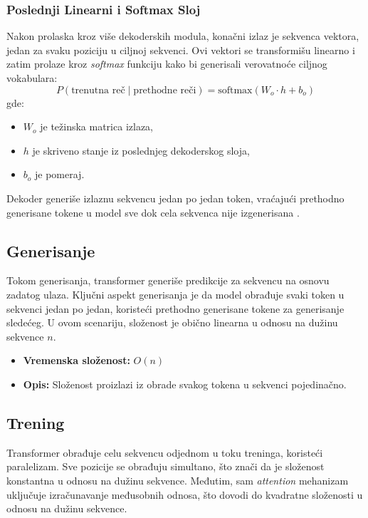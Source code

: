 \documentclass[12pt]{article}
\begin{document}
   \subsubsection*{Poslednji Linearni i Softmax Sloj}
   Nakon prolaska kroz više dekoderskih modula, konačni izlaz je sekvenca vektora, 
   jedan za svaku poziciju u ciljnoj sekvenci. Ovi vektori se transformišu 
   linearno i zatim prolaze kroz \textit{softmax} funkciju kako bi generisali verovatnoće 
   ciljnog vokabulara:
   \[
   P(\text{trenutna reč} \mid \text{prethodne reči}) = \text{softmax}(W_o \cdot h + b_o)
   \]
   \newpage
   gde:
   \begin{itemize}
      \vspace{-0.5cm}
      \setlength\itemsep{0.2em} %
      \item \( W_o \) je težinska matrica izlaza,
      \item \( h \) je skriveno stanje iz poslednjeg dekoderskog sloja,
      \item \( b_o \) je pomeraj.
   \end{itemize}
   Dekoder generiše izlaznu sekvencu jedan po jedan token, vraćajući prethodno 
   generisane tokene u model sve dok cela sekvenca nije izgenerisana \cite{trans_exp}.

   \subsection{Generisanje}
   Tokom generisanja, transformer generiše predikcije za sekvencu na osnovu zadatog ulaza. 
   Ključni aspekt generisanja je da model obrađuje svaki token u sekvenci jedan po jedan, 
   koristeći prethodno generisane tokene za generisanje sledećeg. U ovom scenariju, 
   složenost je obično linearna u odnosu na dužinu sekvence \(n\).

   \begin{itemize}
       \item \textbf{Vremenska složenost:} \(O(n)\)
       \item \textbf{Opis:} Složenost proizlazi iz obrade svakog tokena u sekvenci pojedinačno.
   \end{itemize}

   \subsection{Trening}
   Transformer obrađuje celu sekvencu odjednom u toku treninga, koristeći paralelizam. 
   Sve pozicije se obrađuju simultano, što znači da je složenost konstantna u odnosu 
   na dužinu sekvence. Međutim, sam \textit{attention} mehanizam uključuje 
   izračunavanje međusobnih odnosa, što dovodi do kvadratne složenosti u odnosu 
   na dužinu sekvence.
\end{document}
